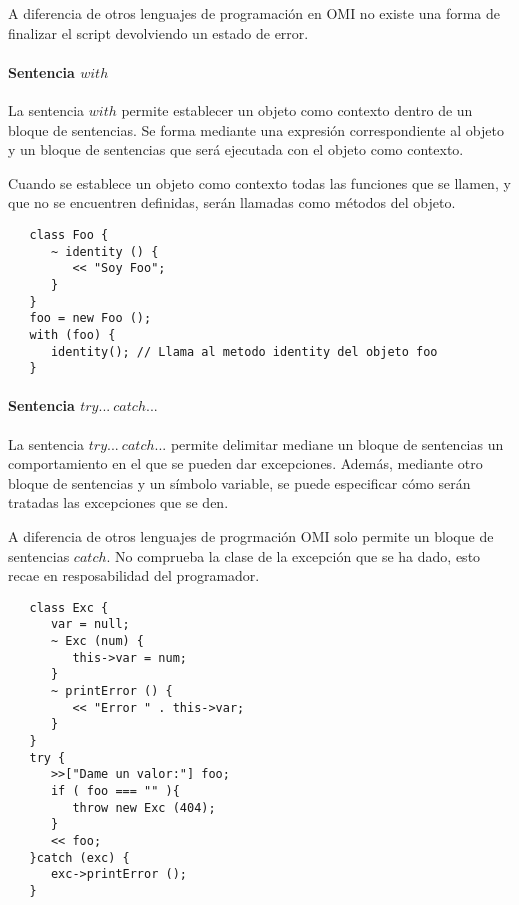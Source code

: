 A diferencia de otros lenguajes de programación en OMI no existe una forma de finalizar el script 
devolviendo un estado de error.

\paragraph{Sentencia $with$} \label{sec:stmt_with}

La sentencia $with$ permite establecer un objeto como contexto dentro de un bloque de sentencias. Se forma mediante
una expresión correspondiente al objeto y un bloque de sentencias que será ejecutada con el objeto como contexto. 

Cuando se establece un objeto como contexto todas las funciones que se llamen, y que no se encuentren definidas, serán 
llamadas como métodos del objeto. \\

\begin{lstlisting}
   class Foo {
      ~ identity () {
         << "Soy Foo";
      } 
   }
   foo = new Foo ();
   with (foo) {
      identity(); // Llama al metodo identity del objeto foo
   }
\end{lstlisting}

\paragraph{Sentencia $try...\ catch...$} \label{sec:stmt_try}

La sentencia $try...\ catch...$ permite delimitar mediane un bloque de sentencias 
un comportamiento en el que se pueden dar excepciones. Además, mediante otro 
bloque de sentencias y un símbolo variable, se puede especificar cómo serán tratadas
las excepciones que se den.

A diferencia de otros lenguajes de progrmación OMI solo permite un bloque de 
sentencias $catch$. No comprueba la clase de la excepción que se ha dado, esto recae
en resposabilidad del programador. \\

\begin{lstlisting}
   class Exc {
      var = null;
      ~ Exc (num) {
         this->var = num;
      }
      ~ printError () {
         << "Error " . this->var;
      }
   }
   try {
      >>["Dame un valor:"] foo;
      if ( foo === "" ){
         throw new Exc (404);
      } 
      << foo;
   }catch (exc) {
      exc->printError ();
   }
\end{lstlisting}

